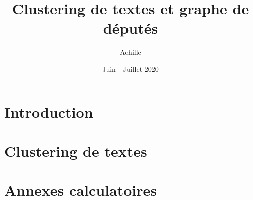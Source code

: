 \documentclass{article}
\title{Clustering de textes et graphe de députés}
\author{Achille}
\date{Juin - Juillet 2020}
\begin{document}
\maketitle
\newpage

\section{Introduction}


\section{Clustering de textes}


\section{Annexes calculatoires}


\cite{ManningSentenceNLP}
\cite{cacaprout}


\end{document}
